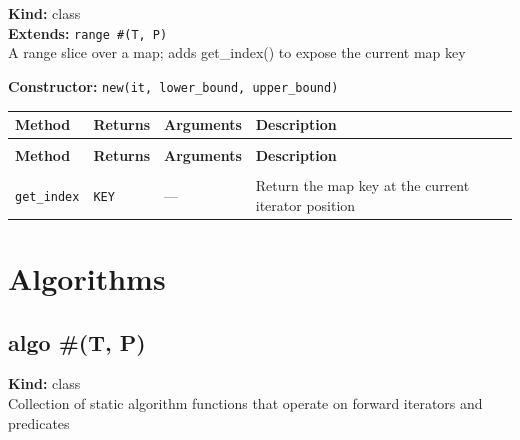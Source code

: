 \documentclass[11pt,letterpaper]{report}
\begin{document}
\noindent\textbf{Kind:} class\\
\noindent\textbf{Extends:} \texttt{range \#(T, P)}\\
\noindent A range slice over a map; adds get\_index() to expose the current map key

\noindent\textbf{Constructor:} \texttt{new(it, lower\_bound, upper\_bound)}

\begin{xltabular}{\linewidth}{>{\small}p{1.35in} >{\small}p{1.25in} >{\small}p{0.95in} >{\small}X}
\toprule
\textbf{Method} & \textbf{Returns} & \textbf{Arguments} & \textbf{Description} \\
\midrule
\endfirsthead
{} \\
\midrule
\textbf{Method} & \textbf{Returns} & \textbf{Arguments} & \textbf{Description} \\
\midrule
\endhead
\midrule
{} \\
\endfoot
\bottomrule
\endlastfoot
\texttt{get\_index} & \texttt{KEY} & --- & Return the map key at the current iterator position \\
\end{xltabular}

\chapter{Algorithms}

\section{algo \#(T, P)}
\label{cls:algoTP}

\noindent\textbf{Kind:} class\\
\noindent Collection of static algorithm functions that operate on forward iterators and predicates
\end{document}
